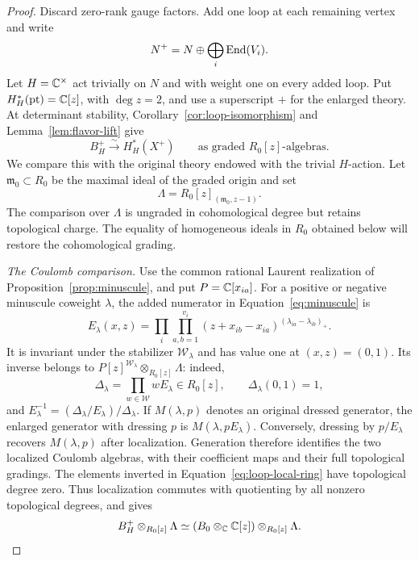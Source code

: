 \begin{proof}
Discard zero-rank gauge factors.  Add one loop at each remaining vertex and
write
\[
 N^+=N\oplus\bigoplus_i\operatorname{End}(V_i).
\]
Let $H=\mathbb C^\times$ act trivially on $N$ and with weight one on every added
loop.  Put $H^*_H(\mathrm{pt})=\mathbb C[z]$, with $\deg z=2$, and use a superscript
$+$ for the enlarged theory.  At determinant stability,
Corollary~\ref{cor:loop-isomorphism} and Lemma~\ref{lem:flavor-lift} give
\begin{equation}\label{eq:enlarged-flavor-isomorphism}
 B_H^+\xrightarrow{\ \sim\ }H_H^*(X^+)
 \qquad\text{as graded }R_0[z]\text{-algebras}.
\end{equation}
We compare this with the original theory endowed with the trivial $H$-action.
Let $\mathfrak m_0\subset R_0$ be the maximal ideal of the graded origin and
set
\begin{equation}\label{eq:loop-local-ring}
 \Lambda=R_0[z]_{(\mathfrak m_0,z-1)}.
\end{equation}
The comparison over $\Lambda$ is ungraded in cohomological degree but
retains topological charge.  The equality of homogeneous ideals in $R_0$
obtained below will restore the cohomological grading.

\emph{The Coulomb comparison.}
Use the common rational Laurent realization of
Proposition~\ref{prop:minuscule}, and put $P=\mathbb C[x_{ia}]$.
For a positive or negative minuscule coweight $\lambda$, the added numerator
in Equation~\eqref{eq:minuscule} is
\[
 E_\lambda(x,z)=
   \prod_i\prod_{a,b=1}^{v_i}
     (z+x_{ib}-x_{ia})^{(\lambda_{ia}-\lambda_{ib})_+}.
\]
It is invariant under the stabilizer $\mathcal W_\lambda$ and has value one
at $(x,z)=(0,1)$.  Its inverse belongs to
$P[z]^{\mathcal W_\lambda}\otimes_{R_0[z]}\Lambda$: indeed,
\[
 \Delta_\lambda=\prod_{w\in\mathcal W}wE_\lambda
       \in R_0[z],\qquad \Delta_\lambda(0,1)=1,
\]
and $E_\lambda^{-1}=(\Delta_\lambda/E_\lambda)/\Delta_\lambda$.
If $M(\lambda,p)$ denotes an original dressed generator, the enlarged
generator with dressing $p$ is $M(\lambda,pE_\lambda)$.  Conversely,
dressing by $p/E_\lambda$ recovers $M(\lambda,p)$ after localization.
Generation therefore identifies the two localized Coulomb algebras, with
their coefficient maps and their full topological gradings.  The elements
inverted in Equation~\eqref{eq:loop-local-ring} have topological degree zero.  Thus
localization commutes with quotienting by all nonzero topological degrees,
and gives
\begin{equation}\label{eq:loop-coulomb-localization}
 B_H^+\otimes_{R_0[z]}\Lambda
    \simeq (B_0\otimes_\mathbb C\mathbb C[z])\otimes_{R_0[z]}\Lambda.
\end{equation}


\end{proof}
